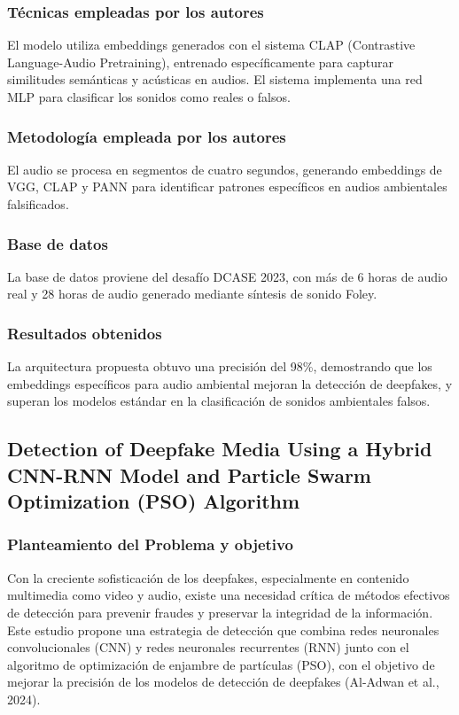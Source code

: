 \subsubsection{Técnicas empleadas por los autores}
El modelo utiliza embeddings generados con el sistema CLAP (Contrastive Language-Audio Pretraining), entrenado específicamente para capturar similitudes semánticas y acústicas en audios. El sistema implementa una red MLP para clasificar los sonidos como reales o falsos.

\subsubsection{Metodología empleada por los autores}
El audio se procesa en segmentos de cuatro segundos, generando embeddings de VGG, CLAP y PANN para identificar patrones específicos en audios ambientales falsificados.

\subsubsection{Base de datos}
La base de datos proviene del desafío DCASE 2023, con más de 6 horas de audio real y 28 horas de audio generado mediante síntesis de sonido Foley.

\subsubsection{Resultados obtenidos}
La arquitectura propuesta obtuvo una precisión del 98\%, demostrando que los embeddings específicos para audio ambiental mejoran la detección de deepfakes, y superan los modelos estándar en la clasificación de sonidos ambientales falsos.

\subsection{Detection of Deepfake Media Using a Hybrid CNN-RNN Model and Particle Swarm Optimization (PSO) Algorithm \citep*{pr_dehghani2018copper}}

\subsubsection{Planteamiento del Problema y objetivo }
Con la creciente sofisticación de los deepfakes, especialmente en contenido multimedia como video y audio, existe una necesidad crítica de métodos efectivos de detección para prevenir fraudes y preservar la integridad de la información. Este estudio propone una estrategia de detección que combina redes neuronales convolucionales (CNN) y redes neuronales recurrentes (RNN) junto con el algoritmo de optimización de enjambre de partículas (PSO), con el objetivo de mejorar la precisión de los modelos de detección de deepfakes (Al-Adwan et al., 2024).

